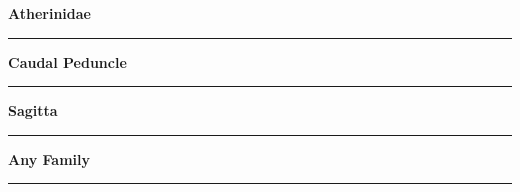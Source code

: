 \documentclass[11pt]{exam}
\newcommand*\Matching[1]{
\ifprintanswers
	\textbf{#1}
\else
	\rule{2.1in}{0.4pt}
\fi
}
\newlength\matchlena
\newlength\matchlenb
\newcommand\MatchQuestion[2]{%
	\setlength\matchlenb{\linewidth}
	\addtolength\matchlenb{-\matchlena}
	\parbox[t]{\matchlena}{\Matching{#1}}\enspace\parbox[t]{\matchlenb}{#2}}
\begin{document}
\begin{questions}
\begin{multicols}{2}
\question\MatchQuestion{Atherinidae}{}
\vspace{2\baselineskip}

\question\MatchQuestion{Caudal Peduncle}{}
\vspace{2\baselineskip}

\question[\textsc{ec}]\MatchQuestion{Sagitta}{}
\vspace{2\baselineskip}

\question[\textsc{ec}]\MatchQuestion{Any Family}{}
\vspace{2\baselineskip}

\end{multicols}

\end{questions}
\end{document}
